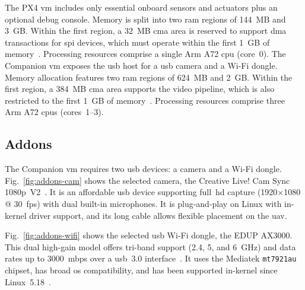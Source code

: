 The PX4 \gls{vm} includes only essential onboard
sensors and actuators plus an optional debug console.
Memory is split into two \gls{ram} regions of 144~MB and 3~GB. Within the first region, a 32~MB
\gls{cma} area is reserved to support \gls{dma} transactions for \gls{spi}
devices, which must operate within the first 1~GB of
memory~\cite{bcm2711peripherals}. Processing resources comprise a single Arm A72
\gls{cpu} (core~0).
%
The Companion \gls{vm} exposes the \gls{usb} host for a \gls{usb} camera and a Wi-Fi dongle. Memory allocation features two
\gls{ram} regions of 624~MB and 2~GB. Within the first region, a
384~MB \gls{cma} area supports the video pipeline, which is also restricted to the first 1~GB of
memory~\cite{bcm2711peripherals}. Processing resources comprise three Arm
A72 \glspl{cpu} (cores~1–3).

\subsection{Addons}
\label{sec:addons}
The Companion \gls{vm} requires two \gls{usb} devices: a camera and a Wi-Fi
dongle. Fig.~\ref{fig:addons-cam} shows the selected camera, the Creative Live!
Cam Sync 1080p~V2~\cite{creative-cam}. It is an affordable \gls{usb} device
supporting full~\gls{hd} capture (1920\(\times\)1080 @ 30~\gls{fps}) with dual built-in
microphones. It is plug-and-play on Linux with in-kernel driver support, and its
long cable allows flexible placement on the \gls{uav}.

Fig.~\ref{fig:addons-wifi} shows the selected \gls{usb} Wi-Fi dongle, the EDUP
AX3000. This dual high-gain model offers tri-band support (2.4, 5, and
6~GHz) and data rates up to 3000~\gls{mbps} over a \gls{usb}~3.0 interface~\cite{ax3000-specs}. It uses the Mediatek \lstinline{mt7921au} chipset,
has broad \gls{os} compatibility, and has been supported in-kernel since
Linux~5.18~\cite{ax3000-linux}.

